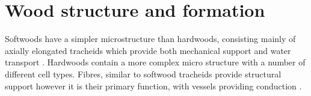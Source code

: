 \section{Wood structure and formation}
Softwoods have a simpler microstructure than hardwoods, consisting mainly of
axially elongated tracheids which provide both mechanical support and water
transport \cite{bowyer2007forest}. Hardwoods contain a more complex micro structure with a number
of different cell types. Fibres, similar to softwood tracheids provide
structural support however it is their primary function, with vessels providing
conduction \cite{walker1993primary}.